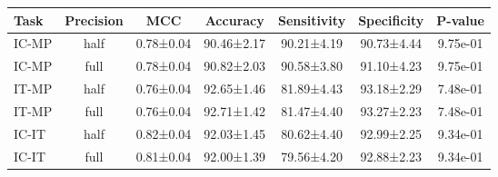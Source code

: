 \begin{tabular}{lcccccc}
\toprule
 Task & Precision &       MCC &   Accuracy & Sensitivity & Specificity &  P-value \\
\midrule
IC-MP &      half & 0.78±0.04 & 90.46±2.17 &  90.21±4.19 &  90.73±4.44 & 9.75e-01 \\
IC-MP &      full & 0.78±0.04 & 90.82±2.03 &  90.58±3.80 &  91.10±4.23 & 9.75e-01 \\
IT-MP &      half & 0.76±0.04 & 92.65±1.46 &  81.89±4.43 &  93.18±2.29 & 7.48e-01 \\
IT-MP &      full & 0.76±0.04 & 92.71±1.42 &  81.47±4.40 &  93.27±2.23 & 7.48e-01 \\
IC-IT &      half & 0.82±0.04 & 92.03±1.45 &  80.62±4.40 &  92.99±2.25 & 9.34e-01 \\
IC-IT &      full & 0.81±0.04 & 92.00±1.39 &  79.56±4.20 &  92.88±2.23 & 9.34e-01 \\
\bottomrule
\end{tabular}
